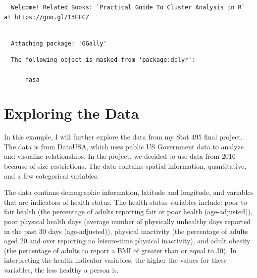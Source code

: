 \documentclass[12pt,twoside]{amherstthesis}
\begin{document}
  \begin{verbatim}
  Welcome! Related Books: `Practical Guide To Cluster Analysis in R` at https://goo.gl/13EFCZ
  \end{verbatim}
  
  \begin{Shaded}
  \begin{Highlighting}[]
  \end{Highlighting}
  \end{Shaded}
  
  \begin{verbatim}
  
  Attaching package: 'GGally'
  \end{verbatim}
  
  \begin{verbatim}
  The following object is masked from 'package:dplyr':
  
      nasa
  \end{verbatim}
  
  \section{Exploring the Data}\label{exploring-the-data}
  
  In this example, I will further explore the data from my Stat 495 final
  project. The data is from DataUSA, which uses public US Government data
  to analyze and visualize relationships. In the project, we decided to
  use data from 2016 because of size restrictions. The data contains
  spatial information, quantitative, and a few categorical variables.
  
  The data contians demographic information, latitude and longitude, and
  variables that are indicators of health status. The health status
  variables include: poor to fair health (the percentage of adults
  reporting fair or poor health (age-adjusted)), poor physical health days
  (average number of physically unhealthy days reported in the past 30
  days (age-adjusted)), physical inactivity (the percentage of adults aged
  20 and over reporting no leisure-time physical inactivity), and adult
  obesity (the percentage of adults to report a BMI of greater than or
  equal to 30). In interpreting the health indicator variables, the higher
  the values for these variables, the less healthy a person is.
  
\end{document}

